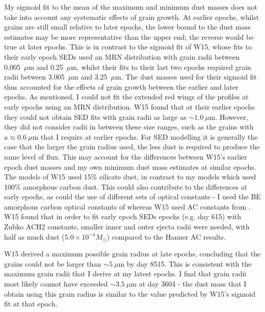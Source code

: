 My sigmoid fit to the mean of the maximum and 
minimum dust masses does not take into account any systematic effects of 
grain growth.  At earlier epochs, whilst grains are 
still small relative to later epochs, the lower bound to the dust mass 
estimates may be more representative than the upper end; the reverse would 
be true at later epochs.
This is in contrast to the sigmoid fit of W15, whose fits to their early 
epoch SEDs used an MRN distribution with grain radii between 0.005~$\mu$m 
and 0.25~$\mu$m, whilst their fits to their last two epochs required grain 
radii between 3.005~$\mu$m and 3.25~$\mu$m. The dust masses used for their 
sigmoid fit thus accounted for the effects of grain growth between the earlier 
and later epochs. As mentioned, I could not fit the extended red wings of 
the profiles at early epochs using an MRN distribution.  W15 found that at 
their earlier epochs they could not obtain SED fits with grain radii as 
large as $\sim 1.0~\mu$m. However, they did not consider radii in between 
these size ranges, such as the grains with $a \approx 0.6~\mu$m that I 
require at earlier epochs.  For SED modelling it is generally the case that 
the larger the grain radius used, the less dust is required to produce the 
same level of flux.  This may account for the differences between W15's 
earlier epoch dust masses and my own minimum dust mass estimates at 
similar epochs.  The models of W15 used 15\% silicate dust, in contrast to 
my models which used 100\% amorphous carbon dust.  This could also 
contribute to the differences at early epochs, as could the use of 
different sets of optical constants - I used the BE amorphous carbon 
optical constants of \citet{Zubko1996} whereas W15 used AC constants from 
\citet{Hanner1988}.  W15 found that in order to fit early epoch SEDs epochs 
(e.g. day 615) with Zubko ACH2 constants, smaller inner and outer ejecta 
radii were needed, with half as much dust ($5.0 \times 10^{-4}M_{\odot}$) 
compared to the Hanner AC results.

W15 derived a maximum possible grain radius at late epochs, concluding that 
the grains could not be larger than $\sim 5~\mu$m by day 8515. This is 
consistent with the maximum grain radii that I derive at my latest 
epochs.  I find that grain radii most likely cannot have exceeded $\sim 
3.5~\mu$m at day 3604 - the dust mass that I obtain using this grain 
radius is similar to the value predicted by W15's sigmoid fit at that 
epoch.

